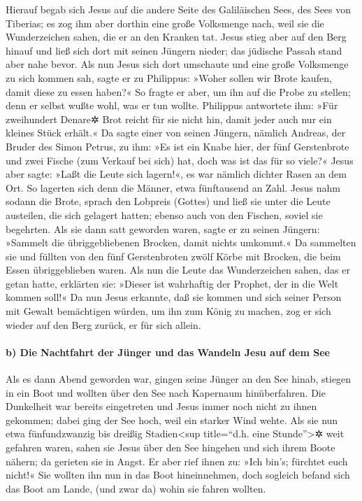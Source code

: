  Hierauf begab sich Jesus auf die andere Seite des
Galiläischen Sees, des Sees von Tiberias;  es zog ihm aber
dorthin eine große Volksmenge nach, weil sie die Wunderzeichen sahen,
die er an den Kranken tat.  Jesus stieg aber auf den Berg
hinauf und ließ sich dort mit seinen Jüngern nieder;  das
jüdische Passah stand aber nahe bevor.  Als nun Jesus sich
dort umschaute und eine große Volksmenge zu sich kommen sah, sagte er zu
Philippus: »Woher sollen wir Brote kaufen, damit diese zu essen haben?«
 So fragte er aber, um ihn auf die Probe zu stellen; denn
er selbst wußte wohl, was er tun wollte.  Philippus
antwortete ihm: »Für zweihundert Denare✲ Brot reicht für sie nicht hin,
damit jeder auch nur ein kleines Stück erhält.«  Da sagte
einer von seinen Jüngern, nämlich Andreas, der Bruder des Simon Petrus,
zu ihm:  »Es ist ein Knabe hier, der fünf Gerstenbrote und
zwei Fische (zum Verkauf bei sich) hat, doch was ist das für so viele?«
 Jesus aber sagte: »Laßt die Leute sich lagern!«, es war
nämlich dichter Rasen an dem Ort. So lagerten sich denn die Männer, etwa
fünftausend an Zahl.  Jesus nahm sodann die Brote, sprach
den Lobpreis (Gottes) und ließ sie unter die Leute austeilen, die sich
gelagert hatten; ebenso auch von den Fischen, soviel sie begehrten.
 Als sie dann satt geworden waren, sagte er zu seinen
Jüngern: »Sammelt die übriggebliebenen Brocken, damit nichts umkommt.«
 Da sammelten sie und füllten von den fünf Gerstenbroten
zwölf Körbe mit Brocken, die beim Essen übriggeblieben waren.
 Als nun die Leute das Wunderzeichen sahen, das er getan
hatte, erklärten sie: »Dieser ist wahrhaftig der Prophet, der in die
Welt kommen soll!«  Da nun Jesus erkannte, daß sie kommen
und sich seiner Person mit Gewalt bemächtigen würden, um ihn zum König
zu machen, zog er sich wieder auf den Berg zurück, er für sich allein.

\hypertarget{b-die-nachtfahrt-der-juxfcnger-und-das-wandeln-jesu-auf-dem-see}{%
\paragraph{b) Die Nachtfahrt der Jünger und das Wandeln Jesu auf dem
See}\label{b-die-nachtfahrt-der-juxfcnger-und-das-wandeln-jesu-auf-dem-see}}

 Als es dann Abend geworden war, gingen seine Jünger an
den See hinab,  stiegen in ein Boot und wollten über den
See nach Kapernaum hinüberfahren. Die Dunkelheit war bereits eingetreten
und Jesus immer noch nicht zu ihnen gekommen;  dabei ging
der See hoch, weil ein starker Wind wehte.  Als sie nun
etwa fünfundzwanzig bis dreißig Stadien\textless sup title=``d.h. eine
Stunde''\textgreater✲ weit gefahren waren, sahen sie Jesus über den See
hingehen und sich ihrem Boote nähern; da gerieten sie in Angst.
 Er aber rief ihnen zu:  »Ich bin's;
fürchtet euch nicht!« Sie wollten ihn nun in das Boot hineinnehmen, doch
sogleich befand sich das Boot am Lande, (und zwar da) wohin sie fahren
wollten.


